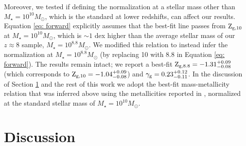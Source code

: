 \documentclass[twocolumn]{aastex631}
\begin{document}
Moreover, we tested if defining the normalization at a stellar mass other than $M_{\star} = 10^{10}M_{\odot}$, which is the standard at lower redshifts, can affect our results. Equation \ref{eq: forward} explicitly assumes that the best-fit line passes from $\textnormal{Z}_{\textnormal{\scriptsize g,10}}$ at $M_{\star} = 10^{10}M_{\odot}$, which is $\sim 1$ dex higher than the average stellar mass of our $z \approx 8$ sample, $M_{\star} = 10^{8.8}M_{\odot}$. We modified this relation to instead infer the normalization at $M_{\star} = 10^{8.8}M_{\odot}$ (by replacing 10 with 8.8 in Equation \ref{eq: forward}). The results remain intact; we report a best-fit $\textnormal{Z}_{\textnormal{\scriptsize g,8.8}} = -1.31^{+0.09}_{-0.08}$ (which corresponds to $\textnormal{Z}_{\textnormal{\scriptsize g,10}} = -1.04^{+0.09}_{-0.08}$) and $\gamma_{\textnormal{\scriptsize g}} = 0.23^{+0.12}_{-0.11}$. In the discussion of Section \ref{sec: discussion} and the rest of this work we adopt the best-fit mass-metallicity relation that was inferred above using the metallicities reported in \cite{curti+2022}, normalized at the standard stellar mass of $M_{\star} = 10^{10}M_{\odot}$. 


\section{Discussion} \label{sec: discussion}
\end{document}

